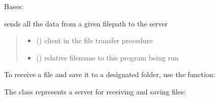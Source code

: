 \documentclass[letterpaper,10pt,english,openany,oneside]{sphinxmanual}
\begin{document}
\begin{fulllineitems}
\label{\detokenize{index:client.FileTransferClient}}
\pysigstartsignatures
\pysigline
{}
\pysigstopsignatures
\sphinxAtStartPar
Bases: 

\begin{fulllineitems}
\label{\detokenize{index:client.FileTransferClient.send_file}}
\pysigstartsignatures
\pysiglinewithargsret
{}
{}
{}
\pysigstopsignatures
\sphinxAtStartPar
sends all the data from a given filepath to the server
\begin{quote}\begin{description}
\begin{itemize}
\item {} 
\sphinxAtStartPar
{} ({\hyperref[\detokenize{index:client.FileTransferClient}]{}}) \textendash{} client in the file transfer procedure

\item {} 
\sphinxAtStartPar
{} () \textendash{} relative filename to this program being run

\end{itemize}

\end{description}\end{quote}

\end{fulllineitems}


\end{fulllineitems}


\sphinxAtStartPar
To receive a file and save it to a designated folder, use the  function:

\sphinxAtStartPar
The  class represents a server for receiving and saving files:
\end{document}
